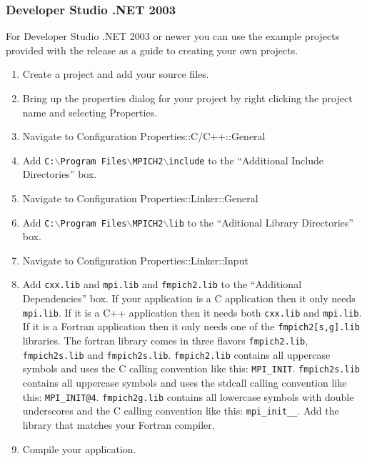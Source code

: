 \documentclass[dvipdfm,11pt]{article}
\begin{document}
\subsubsection{Developer Studio .NET 2003}
For Developer Studio .NET 2003 or newer you can use the example projects provided
with the release as a guide to creating your own projects.

\begin{enumerate}
\item Create a project and add your source files.

\item Bring up the properties dialog for your project by right clicking the project
name and selecting Properties.

\item Navigate to Configuration Properties::C/C++::General
\item Add \texttt{C:$\backslash$Program Files$\backslash$MPICH2$\backslash$include}
to the ``Additional Include Directories'' box.

\item Navigate to Configuration Properties::Linker::General
\item Add \texttt{C:$\backslash$Program Files$\backslash$MPICH2$\backslash$lib}
to the ``Aditional Library Directories'' box.

\item Navigate to Configuration Properties::Linker::Input
\item Add \texttt{cxx.lib} and \texttt{mpi.lib} and \texttt{fmpich2.lib} to the ``Additional Dependencies'' box.  If your
application is a C application then it only needs \texttt{mpi.lib}.  If it is a C++ application then it
needs both \texttt{cxx.lib} and \texttt{mpi.lib}.  If it is a Fortran application then it only needs one of the \texttt{fmpich2[s,g].lib} libraries.
The fortran library comes in three flavors \texttt{fmpich2.lib}, \texttt{fmpich2s.lib} and \texttt{fmpich2s.lib}.  \texttt{fmpich2.lib}
contains all uppercase symbols and uses the C calling convention like this: \texttt{MPI\_INIT}.  \texttt{fmpich2s.lib}
contains all uppercase symbols and uses the stdcall calling convention like this: \texttt{MPI\_INIT@4}.
\texttt{fmpich2g.lib} contains all lowercase symbols with double underscores and the C calling convention
like this: \texttt{mpi\_init\_\_}.  Add the library that matches your Fortran compiler.

\item Compile your application.
\end{enumerate}
\end{document}
